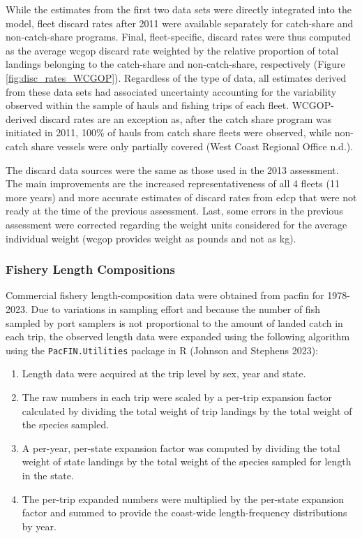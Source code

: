 \documentclass[11pt,
  letterpaper,
]{article}
\providecommand{\tightlist}{%
  \setlength{\itemsep}{0pt}\setlength{\parskip}{0pt}}
\providecommand{\tightlist}{%
  \setlength{\itemsep}{0pt}\setlength{\parskip}{0pt}}
\begin{document}
While the estimates from the first two data sets were directly integrated into the model, fleet discard rates after 2011 were available separately for catch-share and non-catch-share programs. Final, fleet-specific, discard rates were thus computed as the average \gls{wcgop} discard rate weighted by the relative proportion of total landings belonging to the catch-share and non-catch-share, respectively (Figure \ref{fig:disc_rates_WCGOP}). Regardless of the type of data, all estimates derived from these data sets had associated uncertainty accounting for the variability observed within the sample of hauls and fishing trips of each fleet. WCGOP-derived discard rates are an exception as, after the catch share program was initiated in 2011, 100\% of hauls from catch share fleets were observed, while non-catch share vessels were only partially covered (West Coast Regional Office n.d.).

The discard data sources were the same as those used in the 2013 assessment. The main improvements are the increased representativeness of all 4 fleets (11 more years) and more accurate estimates of discard rates from \gls{edcp} that were not ready at the time of the previous assessment. Last, some errors in the previous assessment were corrected regarding the weight units considered for the average individual weight (\gls{wcgop} provides weight as pounds and not as kg).

\hypertarget{fishery-length-compositions}{%
\subsubsection{Fishery Length Compositions}\label{fishery-length-compositions}}

Commercial fishery length-composition data were obtained from \gls{pacfin} for 1978-2023. Due to variations in sampling effort and because the number of fish sampled by port samplers is not proportional to the amount of landed catch in each trip, the observed length data were expanded using the following algorithm using the \texttt{PacFIN.Utilities} package in R (Johnson and Stephens 2023):

\begin{enumerate}
\def\labelenumi{\arabic{enumi}.}
\tightlist
\item
  Length data were acquired at the trip level by sex, year and state.
\item
  The raw numbers in each trip were scaled by a per-trip expansion factor calculated by dividing the total weight of trip landings by the total weight of the species sampled.
\item
  A per-year, per-state expansion factor was computed by dividing the total weight of state landings by the total weight of the species sampled for length in the state.
\item
  The per-trip expanded numbers were multiplied by the per-state expansion factor and summed to provide the coast-wide length-frequency distributions by year.
\end{enumerate}
\end{document}
